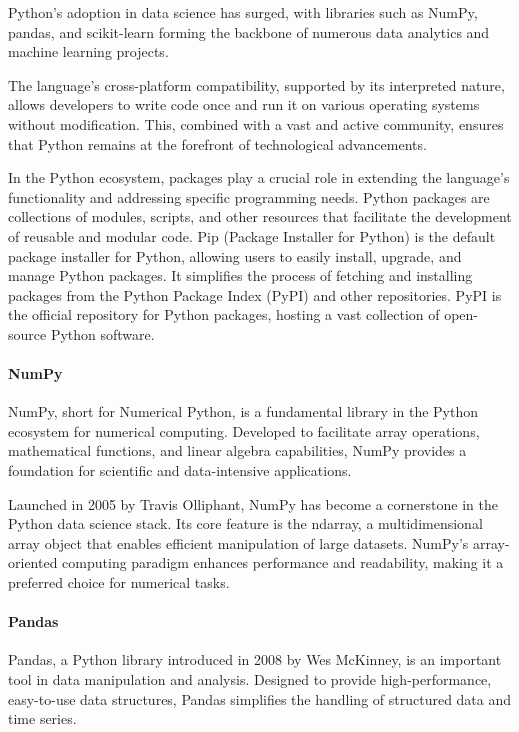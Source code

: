 Python's adoption in data science has surged, with libraries such as NumPy, pandas, and scikit-learn forming the backbone of numerous data analytics and machine learning projects.

The language's cross-platform compatibility, supported by its interpreted nature, allows developers to write code once and run it on various operating systems without modification. This, combined with a vast and active community, ensures that Python remains at the forefront of technological advancements.

In the Python ecosystem, packages play a crucial role in extending the language's functionality and addressing specific programming needs. Python packages are collections of modules, scripts, and other resources that facilitate the development of reusable and modular code. Pip (Package Installer for Python) is the default package installer for Python, allowing users to easily install, upgrade, and manage Python packages. It simplifies the process of fetching and installing packages from the Python Package Index (PyPI) and other repositories. PyPI is the official repository for Python packages, hosting a vast collection of open-source Python software.

\paragraph*{NumPy} NumPy, short for Numerical Python, is a fundamental library in the Python ecosystem for numerical computing. Developed to facilitate array operations, mathematical functions, and linear algebra capabilities, NumPy provides a foundation for scientific and data-intensive applications.

Launched in 2005 by Travis Olliphant, NumPy has become a cornerstone in the Python data science stack. Its core feature is the ndarray, a multidimensional array object that enables efficient manipulation of large datasets. NumPy's array-oriented computing paradigm enhances performance and readability, making it a preferred choice for numerical tasks.

\paragraph*{Pandas} Pandas, a Python library introduced in 2008 by Wes McKinney, is an important tool in data manipulation and analysis. Designed to provide high-performance, easy-to-use data structures, Pandas simplifies the handling of structured data and time series.

